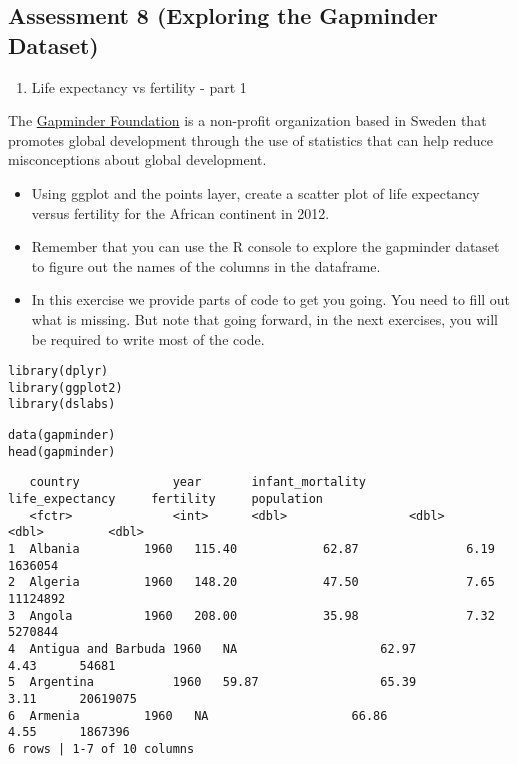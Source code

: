 \documentclass[]{article}
\providecommand{\tightlist}{%
  \setlength{\itemsep}{0pt}\setlength{\parskip}{0pt}}
\begin{document}
\hypertarget{assessment-8-exploring-the-gapminder-dataset}{%
\subsection{Assessment 8 (Exploring the Gapminder
Dataset)}\label{assessment-8-exploring-the-gapminder-dataset}}

\begin{enumerate}
\def\labelenumi{\arabic{enumi}.}
\tightlist
\item
  Life expectancy vs fertility - part 1
\end{enumerate}

The \href{https://www.gapminder.org/}{Gapminder Foundation} is a
non-profit organization based in Sweden that promotes global development
through the use of statistics that can help reduce misconceptions about
global development.

\begin{itemize}
\tightlist
\item
  Using ggplot and the points layer, create a scatter plot of life
  expectancy versus fertility for the African continent in 2012.
\item
  Remember that you can use the R console to explore the gapminder
  dataset to figure out the names of the columns in the dataframe.
\item
  In this exercise we provide parts of code to get you going. You need
  to fill out what is missing. But note that going forward, in the next
  exercises, you will be required to write most of the code.
\end{itemize}

\begin{verbatim}
library(dplyr)
library(ggplot2)
library(dslabs)
\end{verbatim}

\begin{verbatim}
data(gapminder)
head(gapminder)
\end{verbatim}

\begin{verbatim}
   country             year       infant_mortality      life_expectancy     fertility     population
   <fctr>              <int>      <dbl>                 <dbl>               <dbl>         <dbl>
1  Albania         1960   115.40            62.87               6.19      1636054   
2  Algeria         1960   148.20            47.50               7.65      11124892  
3  Angola          1960   208.00            35.98               7.32      5270844   
4  Antigua and Barbuda 1960   NA                    62.97               4.43      54681 
5  Argentina           1960   59.87                 65.39               3.11      20619075  
6  Armenia         1960   NA                    66.86               4.55      1867396   
6 rows | 1-7 of 10 columns
\end{verbatim}
\end{document}
